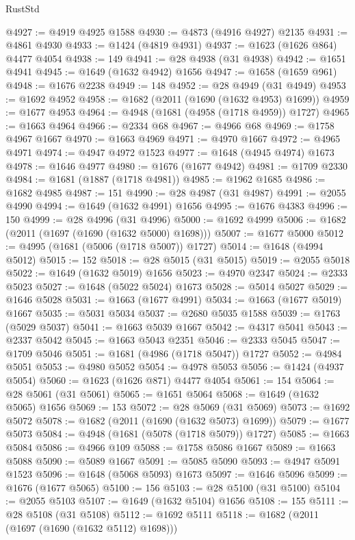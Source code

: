 \begin{lexlean}{RustStd}
\begin{coremodule}
{\begin{coremodule}
{{{{{{{{{{{{{{{{{{{{{{{{{{{{{{{{{{{{{{{{{{{{@4927 := @4919 @4925 @1588
@4930 := @4873 (@4916 @4927) @2135
@4931 := @4861 @4930
@4933 := @1424 (@4819 @4931)
@4937 := @1623 (@1626 @864) @4477 @4054
@4938 := 149
@4941 := @28 @4938 (@31 @4938)
@4942 := @1651 @4941
@4945 := @1649 (@1632 @4942) @1656
@4947 := @1658 (@1659 @961)
@4948 := @1676 @2238
@4949 := 148
@4952 := @28 @4949 (@31 @4949)
@4953 := @1692 @4952
@4958 := @1682 (@2011 (@1690 (@1632 @4953) @1699))
@4959 := @1677 @4953
@4964 := @4948 (@1681 (@4958 (@1718 @4959)) @1727)
@4965 := @1663 @4964
@4966 := @2334 @68
@4967 := @4966 @68
@4969 := @1758 @4967 @1667
@4970 := @1663 @4969
@4971 := @4970 @1667
@4972 := @4965 @4971
@4974 := @4947 @4972 @1523
@4977 := @1648 (@4945 @4974) @1673
@4978 := @1646 @4977
@4980 := @1676 (@1677 @4942)
@4981 := @1709 @2330
@4984 := @1681 (@1887 (@1718 @4981))
@4985 := @1962 @1685
@4986 := @1682 @4985
@4987 := 151
@4990 := @28 @4987 (@31 @4987)
@4991 := @2055 @4990
@4994 := @1649 (@1632 @4991) @1656
@4995 := @1676 @4383
@4996 := 150
@4999 := @28 @4996 (@31 @4996)
@5000 := @1692 @4999
@5006 := @1682 (@2011 (@1697 (@1690 (@1632 @5000) @1698)))
@5007 := @1677 @5000
@5012 := @4995 (@1681 (@5006 (@1718 @5007)) @1727)
@5014 := @1648 (@4994 @5012)
@5015 := 152
@5018 := @28 @5015 (@31 @5015)
@5019 := @2055 @5018
@5022 := @1649 (@1632 @5019) @1656
@5023 := @4970 @2347
@5024 := @2333 @5023
@5027 := @1648 (@5022 @5024) @1673
@5028 := @5014 @5027
@5029 := @1646 @5028
@5031 := @1663 (@1677 @4991)
@5034 := @1663 (@1677 @5019) @1667
@5035 := @5031 @5034
@5037 := @2680 @5035 @1588
@5039 := @1763 (@5029 @5037)
@5041 := @1663 @5039 @1667
@5042 := @4317 @5041
@5043 := @2337 @5042
@5045 := @1663 @5043 @2351
@5046 := @2333 @5045
@5047 := @1709 @5046
@5051 := @1681 (@4986 (@1718 @5047)) @1727
@5052 := @4984 @5051
@5053 := @4980 @5052
@5054 := @4978 @5053
@5056 := @1424 (@4937 @5054)
@5060 := @1623 (@1626 @871) @4477 @4054
@5061 := 154
@5064 := @28 @5061 (@31 @5061)
@5065 := @1651 @5064
@5068 := @1649 (@1632 @5065) @1656
@5069 := 153
@5072 := @28 @5069 (@31 @5069)
@5073 := @1692 @5072
@5078 := @1682 (@2011 (@1690 (@1632 @5073) @1699))
@5079 := @1677 @5073
@5084 := @4948 (@1681 (@5078 (@1718 @5079)) @1727)
@5085 := @1663 @5084
@5086 := @4966 @109
@5088 := @1758 @5086 @1667
@5089 := @1663 @5088
@5090 := @5089 @1667
@5091 := @5085 @5090
@5093 := @4947 @5091 @1523
@5096 := @1648 (@5068 @5093) @1673
@5097 := @1646 @5096
@5099 := @1676 (@1677 @5065)
@5100 := 156
@5103 := @28 @5100 (@31 @5100)
@5104 := @2055 @5103
@5107 := @1649 (@1632 @5104) @1656
@5108 := 155
@5111 := @28 @5108 (@31 @5108)
@5112 := @1692 @5111
@5118 := @1682 (@2011 (@1697 (@1690 (@1632 @5112) @1698)))
}}}}}}}}}}}}}}}}}}}}}}}}}}}}}}}}}}}}}}}}}}}}
\end{coremodule}}
\end{coremodule}
\end{lexlean}
